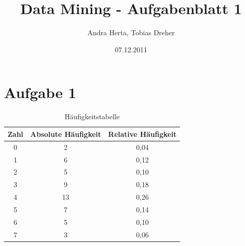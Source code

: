 \title{Data Mining - Aufgabenblatt 1}
\author{Andra Herta, Tobias Dreher}
\date{07.12.2011}

 


\maketitle

\section*{Aufgabe 1}

\begin{table}[htb]
  \centering
  \begin{tabular}{c|c|c}
    \textbf{Zahl} & \textbf{Absolute Häufigkeit} & \textbf{Relative Häufigkeit}\\
    \hline
    0 & 2 & 0,04\\
    1 & 6 & 0,12\\
    2 & 5 & 0,10\\
    3 & 9 & 0,18\\
    4 & 13 & 0,26\\
    5 & 7 & 0,14\\
    6 & 5 & 0,10\\
    7 & 3 & 0,06\\
  \end{tabular}
  \caption{Häufigkeitstabelle}
\end{table}

